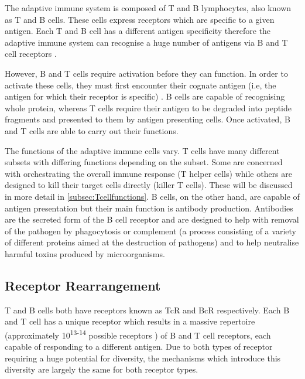 The adaptive immune system is composed of T and B lymphocytes, also known as T and B cells.
These cells express receptors which are specific to a given antigen.
Each T and B cell has a different antigen specificity therefore the adaptive immune system can recognise a huge number of antigens via B and T cell receptors \citep{Janeway2001}.

However, B and T cells require activation before they can function.
In order to activate these cells, they must first encounter their cognate antigen (i.e, the antigen for which their receptor is specific) \citep{Parkin2001}.
B cells are capable of recognising whole protein, whereas T cells require their antigen to be degraded into peptide fragments and presented to them by antigen presenting cells.
Once activated, B and T cells are able to carry out their functions.

The functions of the adaptive immune cells vary.
T cells have many different subsets with differing functions depending on the subset.
Some are concerned with orchestrating the overall immune response (T helper cells) while others are designed to kill their target cells directly (killer T cells).
These will be discussed in more detail in \cref{subsec:Tcellfunctions}.
B cells, on the other hand, are capable of antigen presentation but their main function is antibody production.
Antibodies are the secreted form of the B cell receptor and are designed to help with removal of the pathogen by phagocytosis or complement (a process consisting of a variety of different proteins aimed at the destruction of pathogens) and to help neutralise harmful toxins produced by microorganisms.

\subsection{Receptor Rearrangement}
\label{subsec:receptorrearrangement}

T and B cells both have receptors known as TcR and BcR respectively.
Each B and T cell has a unique receptor which results in a massive repertoire (approximately 10\textsuperscript{13-14} possible receptors \citep{KubyImmunology}) of B and T cell receptors, each capable of responding to a different antigen.
Due to both types of receptor requiring a huge potential for diversity, the mechanisms which introduce this diversity are largely the same for both receptor types.


